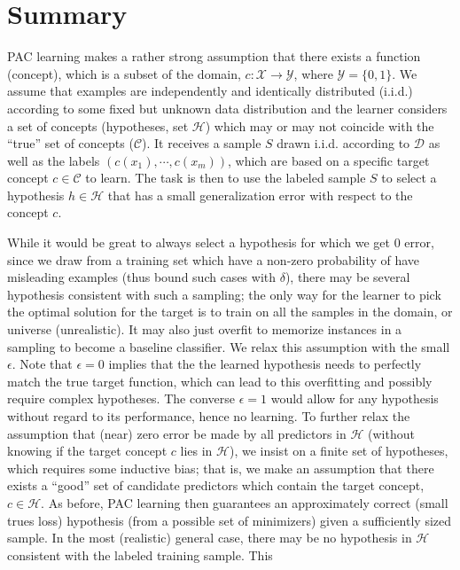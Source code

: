 \section{Summary}
PAC learning makes a rather strong assumption that there exists a function
(concept),
which is a subset of the domain, $c:\mathcal{X} \rightarrow \mathcal{Y}$, where
$\mathcal{Y}=\{0,1\}$.
We assume that examples are independently and identically distributed (i.i.d.)
according to some
fixed but unknown data distribution and the learner considers a set of concepts
(hypotheses, set $\mathcal{H}$)
which may or may not coincide with the ``true'' set of concepts
($\mathcal{C}$).  It receives a sample $S$ drawn i.i.d.
according to $\mathcal{D}$ as well as the labels $(c(x_1), \cdots , c(x_m))$,
which are based on a
specific target concept $c \in \mathcal{C}$ to learn. The task is then to
use the labeled sample $S$
to select a hypothesis $h \in \mathcal{H}$ that has a small generalization
error with respect to the concept $c$.\par
While it would be great to always select a hypothesis for which we get 0
error, since we draw from a training set which have a non-zero probability of
have misleading examples (thus bound such cases with $\delta$),
there may be several hypothesis consistent with such a sampling; the only way
for the learner to
pick the optimal solution for the target is to train on all the samples in the
domain, or universe (unrealistic). It may also just overfit to memorize
instances in a
sampling to become a baseline classifier. We relax this assumption with the
small
$\epsilon$. Note that $\epsilon = 0$
implies that the the learned hypothesis needs to perfectly match the true
target function, which can lead to this overfitting and possibly require
complex
hypotheses. The converse $\epsilon = 1$ would
allow for any hypothesis without regard to its performance, hence no learning.
To
further relax the assumption that (near) zero error be made by all predictors
in
$\mathcal{H}$ (without knowing if the target concept $c$ lies in
$\mathcal{H}$), we insist on a finite set of hypotheses,
which requires some inductive bias; that is, we make an assumption that there
exists a ``good'' set of candidate predictors which contain the target concept,
$c \in \mathcal{H}$. As before, PAC learning then guarantees
an approximately correct (small trues loss) hypothesis (from a possible set of
minimizers) given a sufficiently sized sample.
In the most (realistic) general case, there may be no hypothesis in
$\mathcal{H}$ consistent with the labeled training sample. This
